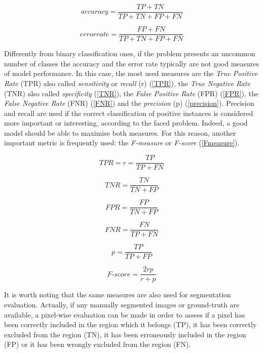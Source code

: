 \documentclass[final,a4paper,12pt,english]{UnicaPhdThesis3}
\begin{document}
\begin{equation}\label{accuracy}
accuracy= \frac{TP + TN}{TP + TN + FP + FN}    
\end{equation}

\begin{equation}\label{error}
error rate= \frac{FP + FN}{TP + TN + FP + FN}    
\end{equation}

Differently from binary classification ones, if the problem presents an uncommon number of classes the accuracy and the error rate typically are not good measures of model performance. In this case, the most used measures are the \textit{True Positive Rate} (\acs{TPR}) also called \textit{sensitivity} or \textit{recall} (r) (\ref{TPR}), the \textit{True Negative Rate} (\acs{TNR}) also called \textit{specificity} (\ref{TNR}), the \textit{False Positive Rate} (\acs{FPR}) (\ref{FPR}), the \textit{False Negative Rate} (\acs{FNR}) (\ref{FNR}) and the \textit{precision} (p) (\ref{precision}). Precision and recall are used if the correct classification of positive instances is considered more important or interesting, according to the faced problem. Indeed, a good model should be able to maximise both measures. For this reason, another important metric is frequently used: the \textit{F-measure} or \textit{F-score} (\ref{Fmeasure}).

\begin{equation}\label{TPR}
TPR = r = \frac{TP}{TP + FN}    
\end{equation}

\begin{equation}\label{TNR}
TNR = \frac{TN}{TN + FP}    
\end{equation}

\begin{equation}\label{FPR}
FPR= \frac{FP}{TN + FP}    
\end{equation}

\begin{equation}\label{FNR}
FNR= \frac{FN}{TP + FN}    
\end{equation}

\begin{equation}\label{precision}
p = \frac{TP}{TP + FP}    
\end{equation}

\begin{equation}\label{Fmeasure}
F\mbox{-}score = \frac{2rp}{r + p}    
\end{equation}

It is worth noting that the same measures are also used for segmentation evaluation. Actually, if any manually segmented images or ground-truth are available, a pixel-wise evaluation can be made in order to assess if a pixel has been correctly included in the region which it belongs (TP), it has been correctly excluded from the region (TN), it has been erroneously included in the region (FP) or it has been wrongly excluded from the region (FN).
\end{document}
